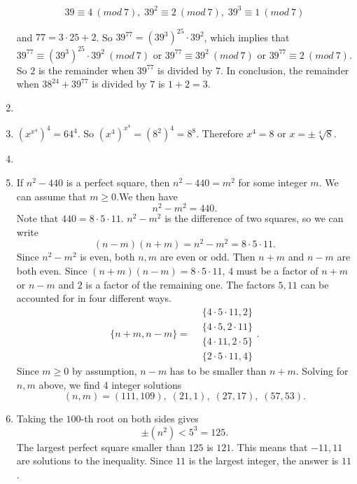 \documentclass[12pt]{article}
\begin{document}
\begin{enumerate}[topsep=2\bigskipamount,itemsep=\bigskipamount]
\[ 39\equiv 4\ (mod\ 7),\; 39^2\equiv 2\ (mod\ 7),\; 39^3\equiv 1\ (mod \ 7)\]

and $77 = 3\cdot 25 + 2$. So $39^{77}=(39^3)^{25}\cdot 39^2$, which implies that
$39^{77}\equiv  (39^3)^{25}\cdot 39^2 \ (mod\ 7)$ or $39^{77}\equiv  39^2 \ (mod\ 7)$ or $39^{77}\equiv  2 \ (mod\ 7)$. So $2$ is the remainder when $39^{77}$ is divided by $7$. In conclusion, the remainder when $38^{24}+39^{77}$ is divided by $7$ is $1+2=3.$

 \item 

 \item $(x^{x^4})^4 = 64^4.$ So $(x^4)^{x^4} = (8^2)^4=8^8.$ Therefore $x^4=8$ or $x =\pm\sqrt[4]{8}.$
 
 \item 
 
 \item If $n^{2}-440$ is a perfect square, then $n^{2}-440=m^{2}$ for some integer $m$. We can assume that $m\geq 0$.We then have 
\begin{equation*}
    n^{2}-m^{2}=440.
\end{equation*}
Note that $440 = 8\cdot5\cdot11$. $n^{2}-m^{2}$ is the difference of two squares, so 
we can write 
\begin{equation*}
    (n-m)(n+m)= n^{2}-m^{2}=8\cdot5\cdot11.
\end{equation*}
Since $n^{2}-m^{2}$ is even, both $n,m$ are even or odd. Then $n+m$ and $n-m$ are both even. Since $(n+m)(n-m)=8\cdot5\cdot11$, $4$ must be a factor of $n+m$ or $n-m$ and $2$ is a factor of the remaining one. The factors $5,11$ can be accounted for in four different ways.
\begin{equation*} \{n+m,n-m\}= 
    \begin{array}{cc}
 &   \{4\cdot 5\cdot 11,2\}\\
     & \{4\cdot5, 2\cdot11 \}\\
     &\{4\cdot11, 2\cdot5\}\\
     & \{2\cdot5\cdot11, 4\}
\end{array}.
\end{equation*}
Since $m\geq0$ by assumption, $n-m$ has to be smaller than $n+m$. Solving for $n,m$ above, we find 4 integer solutions 
\begin{equation*}
    (n,m)= (111,109),\;(21,1),\;(27,17),\; (57,53).
\end{equation*}

\item Taking the $100$-th root on both sides gives 
\begin{equation*}
    \pm (n^{2})<5^{3}=125.
\end{equation*}
The largest perfect square smaller than $125$ is $121$. This means that $-11,11$ are solutions to the inequality. Since $11$ is the largest integer, the answer is $11$.


\end{enumerate}
\end{document}
